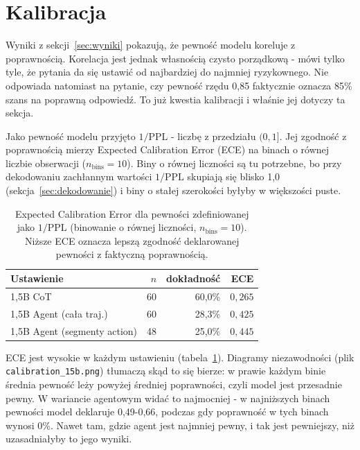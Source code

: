 
\section{Kalibracja}
\label{sec:kalibracja}

Wyniki z sekcji~\ref{sec:wyniki} pokazują, że pewność modelu
koreluje z poprawnością. Korelacja jest jednak własnością czysto
porządkową - mówi tylko tyle, że pytania da się ustawić od
najbardziej do najmniej ryzykownego. Nie odpowiada natomiast na
pytanie, czy pewność rzędu 0,85 faktycznie oznacza 85\% szans na
poprawną odpowiedź. To już kwestia kalibracji i właśnie jej
dotyczy ta sekcja.

Jako pewność modelu przyjęto $1/\mathrm{PPL}$ - liczbę z przedziału
$(0, 1]$. Jej zgodność z poprawnością mierzy Expected Calibration
Error (ECE) na binach o równej liczbie obserwacji
($n_{\text{bins}}=10$). Biny o równej liczności są tu potrzebne,
bo przy dekodowaniu zachłannym wartości $1/\mathrm{PPL}$ skupiają
się blisko 1,0 (sekcja~\ref{sec:dekodowanie}) i biny o stałej
szerokości byłyby w większości puste.

\begin{table}[h]
\centering
\small
\begin{tabular}{lrrr}
\toprule
\textbf{Ustawienie} & $n$ & \textbf{dokładność} & \textbf{ECE} \\
\midrule
1,5B CoT                       & 60 & 60,0\% & $0{,}265$ \\
1,5B Agent (cała traj.)        & 60 & 28,3\% & $0{,}425$ \\
1,5B Agent (segmenty action)   & 48 & 25,0\% & $0{,}445$ \\
\bottomrule
\end{tabular}
\caption{Expected Calibration Error dla pewności zdefiniowanej
jako $1/\mathrm{PPL}$ (binowanie o równej liczności,
$n_{\text{bins}}=10$). Niższe ECE oznacza lepszą zgodność
deklarowanej pewności z faktyczną poprawnością.}
\label{tab:ece}
\end{table}

ECE jest wysokie w każdym ustawieniu (tabela~\ref{tab:ece}).
Diagramy niezawodności (plik \texttt{calibration\_15b.png})
tłumaczą skąd to się bierze: w prawie każdym binie średnia pewność
leży powyżej średniej poprawności, czyli model jest przesadnie
pewny. W wariancie agentowym widać to najmocniej - w najniższych
binach pewności model deklaruje 0,49-0,66, podczas gdy poprawność
w tych binach wynosi 0\%. Nawet tam, gdzie agent jest najmniej
pewny, i tak jest pewniejszy, niż uzasadniałyby to jego wyniki.

